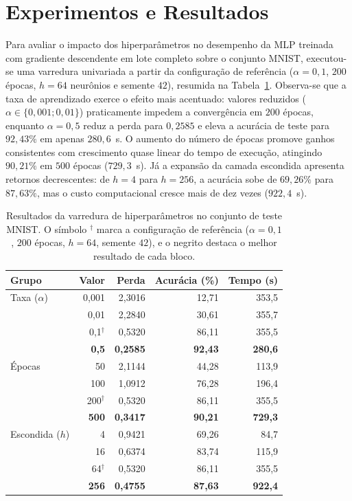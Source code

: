 \section{Experimentos e Resultados}

Para avaliar o impacto dos hiperparâmetros no desempenho da MLP treinada com gradiente descendente em lote completo sobre o conjunto MNIST, executou-se uma varredura univariada a partir da configuração de referência ($\alpha = 0{,}1$, $200$ épocas, $h = 64$ neurônios e semente $42$), resumida na Tabela~\ref{tab:experimentos}. Observa-se que a taxa de aprendizado exerce o efeito mais acentuado: valores reduzidos ($\alpha \in \{0{,}001; 0{,}01\}$) praticamente impedem a convergência em $200$ épocas, enquanto $\alpha = 0{,}5$ reduz a perda para $0{,}2585$ e eleva a acurácia de teste para $92{,}43\%$ em apenas $280{,}6$~s. O aumento do número de épocas promove ganhos consistentes com crescimento quase linear do tempo de execução, atingindo $90{,}21\%$ em $500$ épocas ($729{,}3$~s). Já a expansão da camada escondida apresenta retornos decrescentes: de $h = 4$ para $h = 256$, a acurácia sobe de $69{,}26\%$ para $87{,}63\%$, mas o custo computacional cresce mais de dez vezes ($922{,}4$~s).

\begin{table}[t]
\centering
\small
\setlength{\tabcolsep}{4pt}
\begin{tabular}{lrrrr}
\toprule
Grupo & Valor & Perda & Acurácia (\%) & Tempo (s) \\
\midrule
Taxa ($\alpha$) & 0,001 & 2,3016 & 12,71 & 353,5 \\
                & 0,01 & 2,2840 & 30,61 & 355,7 \\
                & 0,1$^\dagger$ & 0,5320 & 86,11 & 355,5 \\
                & \textbf{0,5} & \textbf{0,2585} & \textbf{92,43} & \textbf{280,6} \\
\midrule
Épocas          & 50 & 2,1144 & 44,28 & 113,9 \\
                & 100 & 1,0912 & 76,28 & 196,4 \\
                & 200$^\dagger$ & 0,5320 & 86,11 & 355,5 \\
                & \textbf{500} & \textbf{0,3417} & \textbf{90,21} & \textbf{729,3} \\
\midrule
Escondida ($h$) & 4 & 0,9421 & 69,26 & 84,7 \\
                & 16 & 0,6374 & 83,74 & 115,9 \\
                & 64$^\dagger$ & 0,5320 & 86,11 & 355,5 \\
                & \textbf{256} & \textbf{0,4755} & \textbf{87,63} & \textbf{922,4} \\
\bottomrule
\end{tabular}
\caption{Resultados da varredura de hiperparâmetros no conjunto de teste MNIST. O símbolo $^\dagger$ marca a configuração de referência ($\alpha = 0{,}1$, $200$ épocas, $h = 64$, semente $42$), e o negrito destaca o melhor resultado de cada bloco.}
\label{tab:experimentos}
\end{table}

